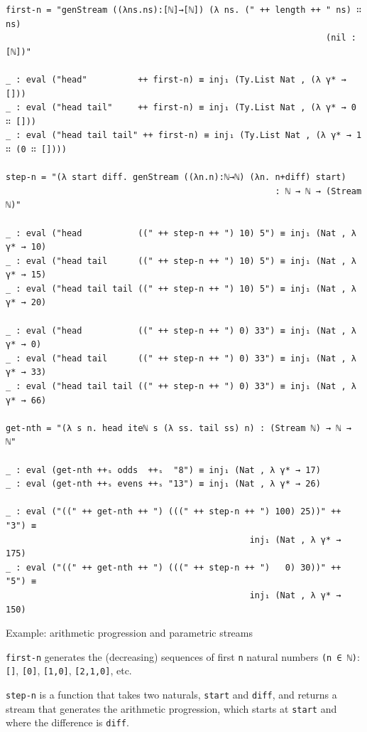 \begin{listing}[H]
\begin{verbatim}
first-n = "genStream ((λns.ns):[ℕ]→[ℕ]) (λ ns. (" ++ length ++ " ns) ∷ ns)
                                                               (nil : [ℕ])"

_ : eval ("head"          ++ first-n) ≡ inj₁ (Ty.List Nat , (λ γ* → []))
_ : eval ("head tail"     ++ first-n) ≡ inj₁ (Ty.List Nat , (λ γ* → 0 ∷ []))
_ : eval ("head tail tail" ++ first-n) ≡ inj₁ (Ty.List Nat , (λ γ* → 1 ∷ (0 ∷ [])))

step-n = "(λ start diff. genStream ((λn.n):ℕ→ℕ) (λn. n+diff) start)
                                                     : ℕ → ℕ → (Stream ℕ)"

_ : eval ("head           ((" ++ step-n ++ ") 10) 5") ≡ inj₁ (Nat , λ γ* → 10)
_ : eval ("head tail      ((" ++ step-n ++ ") 10) 5") ≡ inj₁ (Nat , λ γ* → 15)
_ : eval ("head tail tail ((" ++ step-n ++ ") 10) 5") ≡ inj₁ (Nat , λ γ* → 20)

_ : eval ("head           ((" ++ step-n ++ ") 0) 33") ≡ inj₁ (Nat , λ γ* → 0)
_ : eval ("head tail      ((" ++ step-n ++ ") 0) 33") ≡ inj₁ (Nat , λ γ* → 33)
_ : eval ("head tail tail ((" ++ step-n ++ ") 0) 33") ≡ inj₁ (Nat , λ γ* → 66)

get-nth = "(λ s n. head iteℕ s (λ ss. tail ss) n) : (Stream ℕ) → ℕ → ℕ"

_ : eval (get-nth ++ₛ odds  ++ₛ  "8") ≡ inj₁ (Nat , λ γ* → 17)
_ : eval (get-nth ++ₛ evens ++ₛ "13") ≡ inj₁ (Nat , λ γ* → 26)

_ : eval ("((" ++ get-nth ++ ") (((" ++ step-n ++ ") 100) 25))" ++ "3") ≡
                                                inj₁ (Nat , λ γ* → 175)
_ : eval ("((" ++ get-nth ++ ") (((" ++ step-n ++ ")   0) 30))" ++ "5") ≡
                                                inj₁ (Nat , λ γ* → 150)
\end{verbatim}
\caption{Example: arithmetic progression and parametric streams}
\label{code:examples-streams-2}
\end{listing}

\verb$first-n$ generates the (decreasing) sequences of first \verb$n$ natural numbers \verb$(n ∈ ℕ)$: \verb$[]$, \verb$[0]$, \verb$[1,0]$, \verb$[2,1,0]$, etc.

\verb$step-n$ is a function that takes two naturals, \verb$start$ and \verb$diff$, and returns a stream that generates the arithmetic progression, which starts at \verb$start$ and where the difference is \verb$diff$.


